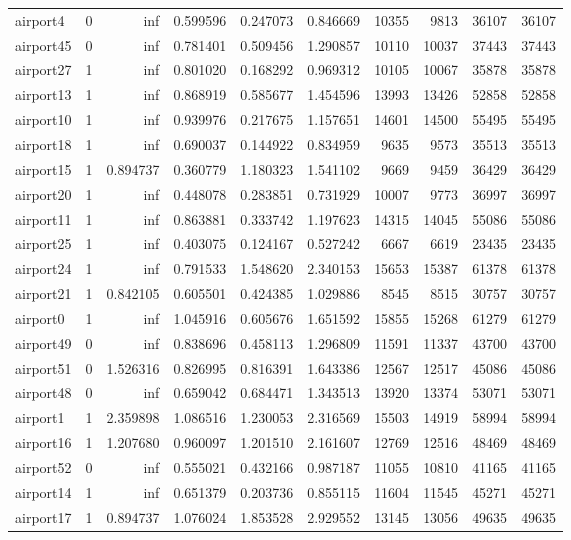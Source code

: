 \begin{longtable}{|l|r|r|r|r|r|r|r|r|r|}
airport4 & 0 & inf & 0.599596 & 0.247073 & 0.846669 & 10355 & 9813 & 36107 & 36107 \\
airport45 & 0 & inf & 0.781401 & 0.509456 & 1.290857 & 10110 & 10037 & 37443 & 37443 \\
airport27 & 1 & inf & 0.801020 & 0.168292 & 0.969312 & 10105 & 10067 & 35878 & 35878 \\
airport13 & 1 & inf & 0.868919 & 0.585677 & 1.454596 & 13993 & 13426 & 52858 & 52858 \\
airport10 & 1 & inf & 0.939976 & 0.217675 & 1.157651 & 14601 & 14500 & 55495 & 55495 \\
airport18 & 1 & inf & 0.690037 & 0.144922 & 0.834959 & 9635 & 9573 & 35513 & 35513 \\
airport15 & 1 & 0.894737 & 0.360779 & 1.180323 & 1.541102 & 9669 & 9459 & 36429 & 36429 \\
airport20 & 1 & inf & 0.448078 & 0.283851 & 0.731929 & 10007 & 9773 & 36997 & 36997 \\
airport11 & 1 & inf & 0.863881 & 0.333742 & 1.197623 & 14315 & 14045 & 55086 & 55086 \\
airport25 & 1 & inf & 0.403075 & 0.124167 & 0.527242 & 6667 & 6619 & 23435 & 23435 \\
airport24 & 1 & inf & 0.791533 & 1.548620 & 2.340153 & 15653 & 15387 & 61378 & 61378 \\
airport21 & 1 & 0.842105 & 0.605501 & 0.424385 & 1.029886 & 8545 & 8515 & 30757 & 30757 \\
airport0 & 1 & inf & 1.045916 & 0.605676 & 1.651592 & 15855 & 15268 & 61279 & 61279 \\
airport49 & 0 & inf & 0.838696 & 0.458113 & 1.296809 & 11591 & 11337 & 43700 & 43700 \\
airport51 & 0 & 1.526316 & 0.826995 & 0.816391 & 1.643386 & 12567 & 12517 & 45086 & 45086 \\
airport48 & 0 & inf & 0.659042 & 0.684471 & 1.343513 & 13920 & 13374 & 53071 & 53071 \\
airport1 & 1 & 2.359898 & 1.086516 & 1.230053 & 2.316569 & 15503 & 14919 & 58994 & 58994 \\
airport16 & 1 & 1.207680 & 0.960097 & 1.201510 & 2.161607 & 12769 & 12516 & 48469 & 48469 \\
airport52 & 0 & inf & 0.555021 & 0.432166 & 0.987187 & 11055 & 10810 & 41165 & 41165 \\
airport14 & 1 & inf & 0.651379 & 0.203736 & 0.855115 & 11604 & 11545 & 45271 & 45271 \\
airport17 & 1 & 0.894737 & 1.076024 & 1.853528 & 2.929552 & 13145 & 13056 & 49635 & 49635 \\

\end{longtable}
